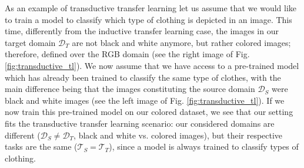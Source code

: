 As an example of transductive transfer learning let us assume that we would like to train a model to classify which type of clothing is depicted in an image. This time, differently from the inductive transfer learning case, the images in our target domain $\mathcal{D}_T$ are not black and white anymore, but rather colored images; therefore, defined over the RGB domain (see the right image of Fig. \ref{fig:transductive_tl}). We now assume that we have access to a pre-trained model which has already been trained to classify the same type of clothes, with the main difference being that the images constituting the source domain $\mathcal{D}_S$ were black and white images (see the left image of Fig. \ref{fig:transductive_tl}). If we now train this pre-trained model on our colored dataset, we see that our setting fits the transductive transfer learning scenario: our considered domains are different ($\mathcal{D}_S \neq \mathcal{D}_T$, black and white vs. colored images), but their respective tasks are the same  ($\mathcal{T}_S = \mathcal{T}_T$), since a model is always trained to classify types of clothing.

